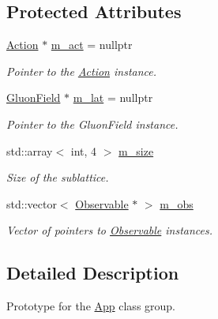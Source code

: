 \subsection*{Protected Attributes}
\begin{DoxyCompactItemize}
\item 
\hyperlink{classAction}{Action} $\ast$ \hyperlink{classApp_a891ae68e54bb04fcf74579c62a8d5860}{m\+\_\+act} = nullptr\hypertarget{classApp_a891ae68e54bb04fcf74579c62a8d5860}{}\label{classApp_a891ae68e54bb04fcf74579c62a8d5860}

\begin{DoxyCompactList}\small\item\em Pointer to the \hyperlink{classAction}{Action} instance. \end{DoxyCompactList}\item 
\hyperlink{field_8h_afe80b127697eba6d6e7fbd8121c8d4ee}{Gluon\+Field} $\ast$ \hyperlink{classApp_a58776f77facca2185bf53974b05a7280}{m\+\_\+lat} = nullptr\hypertarget{classApp_a58776f77facca2185bf53974b05a7280}{}\label{classApp_a58776f77facca2185bf53974b05a7280}

\begin{DoxyCompactList}\small\item\em Pointer to the Gluon\+Field instance. \end{DoxyCompactList}\item 
std\+::array$<$ int, 4 $>$ \hyperlink{classApp_a8ca118f6637bfd14129ba61f985876d7}{m\+\_\+size}\hypertarget{classApp_a8ca118f6637bfd14129ba61f985876d7}{}\label{classApp_a8ca118f6637bfd14129ba61f985876d7}

\begin{DoxyCompactList}\small\item\em Size of the sublattice. \end{DoxyCompactList}\item 
std\+::vector$<$ \hyperlink{classObservable}{Observable} $\ast$ $>$ \hyperlink{classApp_af2803baf8aaf959201b28fb16a46a3d4}{m\+\_\+obs}\hypertarget{classApp_af2803baf8aaf959201b28fb16a46a3d4}{}\label{classApp_af2803baf8aaf959201b28fb16a46a3d4}

\begin{DoxyCompactList}\small\item\em Vector of pointers to \hyperlink{classObservable}{Observable} instances. \end{DoxyCompactList}\end{DoxyCompactItemize}


\subsection{Detailed Description}
Prototype for the \hyperlink{classApp}{App} class group. 

